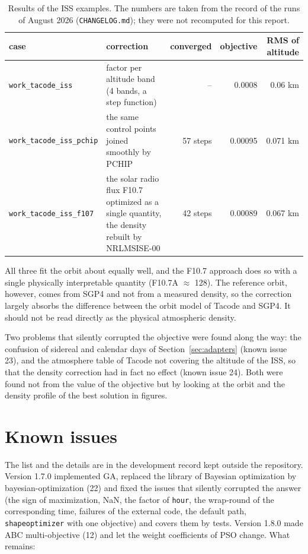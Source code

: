 \documentclass[11pt,a4paper]{article}
\begin{document}
\begin{table}[h]
\centering
\small
\begin{tabularx}{\linewidth}{lXrrr}
\toprule
case & correction & converged & objective & RMS of altitude \\
\midrule
\texttt{work\_tacode\_iss} & factor per altitude band (4 bands, a step function) & -- & 0.0008 & 0.06 km \\
\texttt{work\_tacode\_iss\_pchip} & the same control points joined smoothly by PCHIP & 57 steps & 0.00095 & 0.071 km \\
\texttt{work\_tacode\_iss\_f107} & the solar radio flux F10.7 optimized as a single quantity, the density rebuilt by NRLMSISE-00 & 42 steps & 0.00089 & 0.067 km \\
\bottomrule
\end{tabularx}
\caption{Results of the ISS examples. The numbers are taken from the record of the runs of August 2026 (\texttt{CHANGELOG.md}); they were not recomputed for this report.}
\end{table}

All three fit the orbit about equally well, and the F10.7 approach does so with a single physically interpretable quantity (F10.7A $\approx$ 128). The reference orbit, however, comes from SGP4 and not from a measured density, so the correction largely absorbs the difference between the orbit model of Tacode and SGP4. It should not be read directly as the physical atmospheric density.

Two problems that silently corrupted the objective were found along the way: the confusion of sidereal and calendar days of Section~\ref{sec:adapters} (known issue 23), and the atmosphere table of Tacode not covering the altitude of the ISS, so that the density correction had in fact no effect (known issue 24). Both were found not from the value of the objective but by looking at the orbit and the density profile of the best solution in figures.

\section{Known issues}\label{sec:known-issues}

The list and the details are in the development record kept outside the repository. Version 1.7.0 implemented GA, replaced the library of Bayesian optimization by bayesian-optimization (22) and fixed the issues that silently corrupted the answer (the sign of maximization, NaN, the factor of \texttt{hour}, the wrap-round of the corresponding time, failures of the external code, the default path, \texttt{shapeoptimizer} with one objective) and covers them by tests. Version 1.8.0 made ABC multi-objective (12) and let the weight coefficients of PSO change. What remains:
\end{document}
